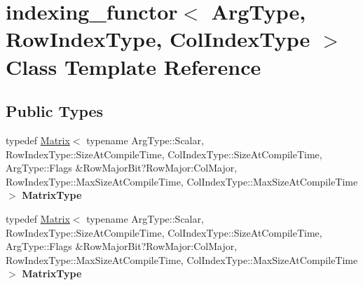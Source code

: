 \hypertarget{classindexing__functor}{}\section{indexing\+\_\+functor$<$ Arg\+Type, Row\+Index\+Type, Col\+Index\+Type $>$ Class Template Reference}
\label{classindexing__functor}
\subsection*{Public Types}
\begin{DoxyCompactItemize}
\item 
\mbox{\label{classindexing__functor_aad785691d331b7861e2b655b83c2a8c5}} 
typedef \hyperlink{group___core___module_class_eigen_1_1_matrix}{Matrix}$<$ typename Arg\+Type\+::\+Scalar, Row\+Index\+Type\+::\+Size\+At\+Compile\+Time, Col\+Index\+Type\+::\+Size\+At\+Compile\+Time, Arg\+Type\+::\+Flags \&Row\+Major\+Bit?Row\+Major\+:\+Col\+Major, Row\+Index\+Type\+::\+Max\+Size\+At\+Compile\+Time, Col\+Index\+Type\+::\+Max\+Size\+At\+Compile\+Time $>$ {\bfseries Matrix\+Type}
\item 
\mbox{\label{classindexing__functor_aad785691d331b7861e2b655b83c2a8c5}} 
typedef \hyperlink{group___core___module_class_eigen_1_1_matrix}{Matrix}$<$ typename Arg\+Type\+::\+Scalar, Row\+Index\+Type\+::\+Size\+At\+Compile\+Time, Col\+Index\+Type\+::\+Size\+At\+Compile\+Time, Arg\+Type\+::\+Flags \&Row\+Major\+Bit?Row\+Major\+:\+Col\+Major, Row\+Index\+Type\+::\+Max\+Size\+At\+Compile\+Time, Col\+Index\+Type\+::\+Max\+Size\+At\+Compile\+Time $>$ {\bfseries Matrix\+Type}
\end{DoxyCompactItemize}
